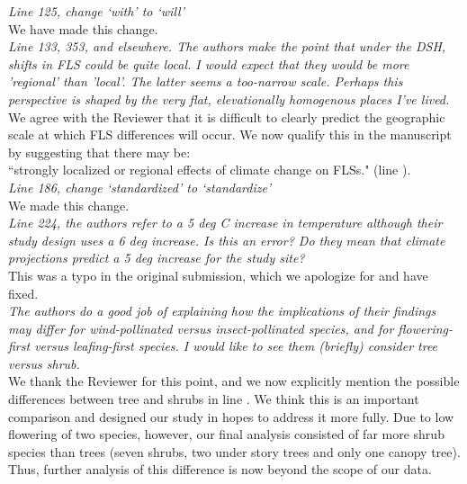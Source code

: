 \documentclass[11pt]{article}
\begin{document}
\emph{Line 125, change `with' to `will'}\\

\noindent We have made this change.\\


\emph{Line 133, 353, and elsewhere. The authors make the point that under the DSH, shifts in FLS could be quite local. I would expect that they would be more 'regional' than 'local'. The latter seems a too-narrow scale. Perhaps this perspective is shaped by the very flat, elevationally homogenous places I've lived.}\\

\noindent We agree with the Reviewer that it is difficult to clearly predict the geographic scale at which FLS differences will occur. We now qualify this in the manuscript by suggesting that there may be:\\

``strongly localized or regional effects of climate change on FLSs." (line ).\\

\emph{Line 186, change `standardized' to `standardize'}\\

\noindent We made this change.\\


\emph{Line 224, the authors refer to a 5 deg C increase in temperature although their study design uses a 6 deg increase. Is this an error? Do they mean that climate projections predict a 5 deg increase for the study site?}\\

\noindent This was a typo in the original submission, which we apologize for and have fixed.\\

\emph{The authors do a good job of explaining how the implications of their findings may differ for wind-pollinated versus insect-pollinated species, and for flowering-first versus leafing-first species. I would like to see them (briefly) consider tree versus shrub.}\\

\noindent We thank the Reviewer for this point, and we now explicitly mention the possible differences between tree and shrubs in line . We think this is an important comparison and designed our study in hopes to address it more fully. Due to low flowering of two species, however, our final analysis consisted of far more shrub species than trees (seven shrubs, two under story trees and only one canopy tree). Thus, further analysis of this difference is now beyond the scope of our data.\\ 
\end{document}

